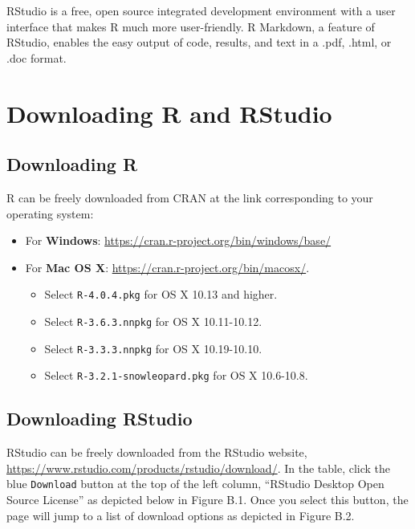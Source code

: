 \documentclass[12pt,]{book}
\providecommand{\tightlist}{%
  \setlength{\itemsep}{0pt}\setlength{\parskip}{0pt}}
\begin{document}
RStudio is a free, open source integrated development environment with a user interface that makes R much more user-friendly. R Markdown, a feature of RStudio, enables the easy output of code, results, and text in a .pdf, .html, or .doc format.

\hypertarget{downloading-r-and-rstudio}{%
\section{Downloading R and RStudio}\label{downloading-r-and-rstudio}}

\hypertarget{downloading-r}{%
\subsection{Downloading R}\label{downloading-r}}

R can be freely downloaded from CRAN at the link corresponding to your operating system:

\begin{itemize}
\tightlist
\item
  For \textbf{Windows}: \url{https://cran.r-project.org/bin/windows/base/}
\item
  For \textbf{Mac OS X}: \url{https://cran.r-project.org/bin/macosx/}.

  \begin{itemize}
  \tightlist
  \item
    Select \texttt{R-4.0.4.pkg} for OS X 10.13 and higher.
  \item
    Select \texttt{R-3.6.3.nnpkg} for OS X 10.11-10.12.
  \item
    Select \texttt{R-3.3.3.nnpkg} for OS X 10.19-10.10.
  \item
    Select \texttt{R-3.2.1-snowleopard.pkg} for OS X 10.6-10.8.
  \end{itemize}
\end{itemize}

\hypertarget{downloading-rstudio}{%
\subsection{Downloading RStudio}\label{downloading-rstudio}}

RStudio can be freely downloaded from the RStudio website, \url{https://www.rstudio.com/products/rstudio/download/}. In the table, click the blue \texttt{Download} button at the top of the left column, ``RStudio Desktop Open Source License'' as depicted below in Figure B.1. Once you select this button, the page will jump to a list of download options as depicted in Figure B.2.
\end{document}
